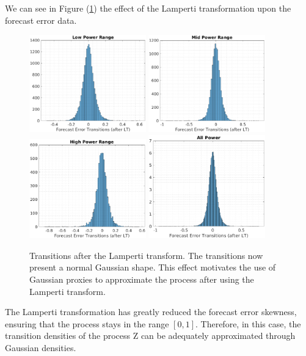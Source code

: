 \documentclass[11pt]{article}
\theoremstyle{definition}
\begin{document}
{\color{red} We can see in Figure (\ref{fig:LP_transitions}) the effect of the Lamperti transformation upon the forecast error data. 

\begin{figure}[H]
\centering
\includegraphics[width=0.45\textwidth]{plots/LP_t_LP.eps}
\includegraphics[width=0.45\textwidth]{plots/MP_t_LP.eps}\\
\includegraphics[width=0.45\textwidth]{plots/HP_t_LP.eps}
\includegraphics[width=0.45\textwidth]{plots/AP_t_LP.eps}
\caption{Transitions after the Lamperti transform. The transitions now present a normal Gaussian shape. This effect motivates the use of Gaussian proxies to approximate the process after using the Lamperti transform.}
  \label{fig:LP_transitions}
\end{figure}

The Lamperti transformation has greatly reduced the forecast error skewness, ensuring that the process stays in the range $[0,1]$. Therefore, in this case, the transition densities of the process Z can be adequately approximated through Gaussian densities.}
\end{document}
